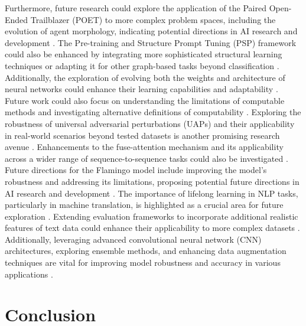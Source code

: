 Furthermore, future research could explore the application of the Paired Open-Ended Trailblazer (POET) to more complex problem spaces, including the evolution of agent morphology, indicating potential directions in AI research and development \cite{wang2019pairedopenendedtrailblazerpoet}. The Pre-training and Structure Prompt Tuning (PSP) framework could also be enhanced by integrating more sophisticated structural learning techniques or adapting it for other graph-based tasks beyond classification \cite{ge2024psppretrainingstructureprompt}. Additionally, the exploration of evolving both the weights and architecture of neural networks could enhance their learning capabilities and adaptability \cite{le2019evolvingselfsupervisedneuralnetworks}. Future work could also focus on understanding the limitations of computable methods and investigating alternative definitions of computability \cite{ryabko2005samplecomplexitycomputationalpattern}. Exploring the robustness of universal adversarial perturbations (UAPs) and their applicability in real-world scenarios beyond tested datasets is another promising research avenue \cite{zhang2024universaladversarialperturbationsvisionlanguage}. Enhancements to the fuse-attention mechanism and its applicability across a wider range of sequence-to-sequence tasks could also be investigated \cite{zheng2023layerwiserepresentationfusioncompositional}. Future directions for the Flamingo model include improving the model's robustness and addressing its limitations, proposing potential future directions in AI research and development \cite{alayrac2022flamingo}. The importance of lifelong learning in NLP tasks, particularly in machine translation, is highlighted as a crucial area for future exploration \cite{zhao2022lifelonglearningmultilingualneural}. Extending evaluation frameworks to incorporate additional realistic features of text data could enhance their applicability to more complex datasets \cite{shi2019newevaluationframeworktopic}. Additionally, leveraging advanced convolutional neural network (CNN) architectures, exploring ensemble methods, and enhancing data augmentation techniques are vital for improving model robustness and accuracy in various applications \cite{zolfaghari2023surveyautomateddetectionclassification}.













\section{Conclusion} \label{sec:Conclusion}






